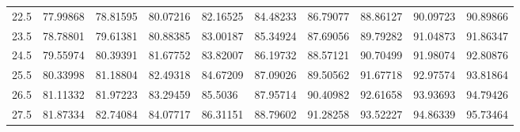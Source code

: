 \documentclass[10pt,twocolumn,letterpaper]{article}
\begin{document}
\begin{table}
{\begin{tabular}{llllllllll}
    22.5            & 77.99868                               & 78.81595                               & 80.07216                                & 82.16525                                & 84.48233                                & 86.79077                                & 88.86127                                & 90.09723                                & 90.89866                                \\
    23.5            & 78.78801                               & 79.61381                               & 80.88385                                & 83.00187                                & 85.34924                                & 87.69056                                & 89.79282                                & 91.04873                                & 91.86347                                \\
    24.5            & 79.55974                               & 80.39391                               & 81.67752                                & 83.82007                                & 86.19732                                & 88.57121                                & 90.70499                                & 91.98074                                & 92.80876                                \\
    25.5            & 80.33998                               & 81.18804                               & 82.49318                                & 84.67209                                & 87.09026                                & 89.50562                                & 91.67718                                & 92.97574                                & 93.81864                                \\
    26.5            & 81.11332                               & 81.97223                               & 83.29459                                & 85.5036                                 & 87.95714                                & 90.40982                                & 92.61658                                & 93.93693                                & 94.79426                                \\
    27.5            & 81.87334                               & 82.74084                               & 84.07717                                & 86.31151                                & 88.79602                                & 91.28258                                & 93.52227                                & 94.86339                                & 95.73464                                \\

\end{tabular}}
\end{table}
\end{document}
